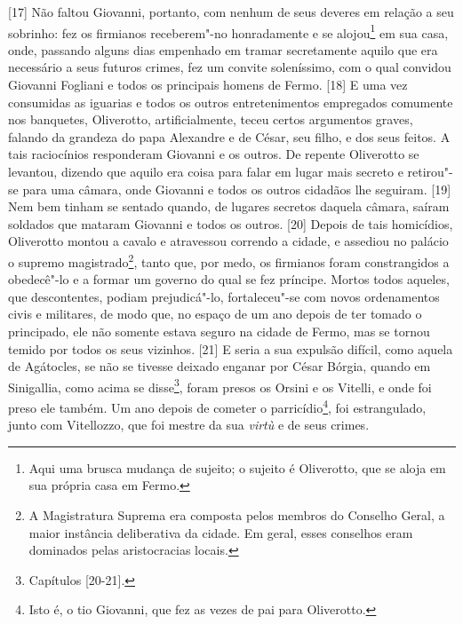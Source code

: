 {[}17{]} Não faltou Giovanni, portanto, com nenhum de seus deveres em
relação a seu sobrinho: fez os firmianos receberem"-no honradamente e se
alojou\footnote{Aqui uma brusca mudança de sujeito; o sujeito é
  Oliverotto, que se aloja em sua própria casa em Fermo.} em sua casa,
onde, passando alguns dias empenhado em tramar secretamente aquilo que
era necessário a seus futuros crimes, fez um convite soleníssimo, com o
qual convidou Giovanni Fogliani e todos os principais homens de Fermo.
{[}18{]} E uma vez consumidas as iguarias e todos os outros
entretenimentos empregados comumente nos banquetes, Oliverotto,
artificialmente, teceu certos argumentos graves, falando da grandeza do
papa Alexandre e de César, seu filho, e dos seus feitos. A tais
raciocínios responderam Giovanni e os outros. De repente Oliverotto se
levantou, dizendo que aquilo era coisa para falar em lugar mais secreto
e retirou"-se para uma câmara, onde Giovanni e todos os outros cidadãos
lhe seguiram. {[}19{]} Nem bem tinham se sentado quando, de lugares
secretos daquela câmara, saíram soldados que mataram Giovanni e todos os
outros. {[}20{]} Depois de tais homicídios, Oliverotto montou a cavalo e
atravessou correndo a cidade, e assediou no palácio o supremo
magistrado\footnote{A Magistratura Suprema era composta pelos membros do
  Conselho Geral, a maior instância deliberativa da cidade. Em geral,
  esses conselhos eram dominados pelas aristocracias locais.}, tanto
que, por medo, os firmianos foram constrangidos a obedecê"-lo e a formar
um governo do qual se fez príncipe. Mortos todos aqueles, que
descontentes, podiam prejudicá"-lo, fortaleceu"-se com novos ordenamentos
civis e militares, de modo que, no espaço de um ano depois de ter tomado
o principado, ele não somente estava seguro na cidade de Fermo, mas se
tornou temido por todos os seus vizinhos. {[}21{]} E seria a sua
expulsão difícil, como aquela de Agátocles, se não se tivesse deixado
enganar por César Bórgia, quando em Sinigallia, como acima se
disse\footnote{Capítulos  {[}20-21{]}.}, foram presos os Orsini e os
Vitelli, e onde foi preso ele também. Um ano depois de cometer o
parricídio\footnote{Isto é, o tio Giovanni, que fez as vezes de pai para
  Oliverotto.}, foi estrangulado, junto com Vitellozzo, que foi mestre
da sua \emph{virtù} e de seus crimes.

